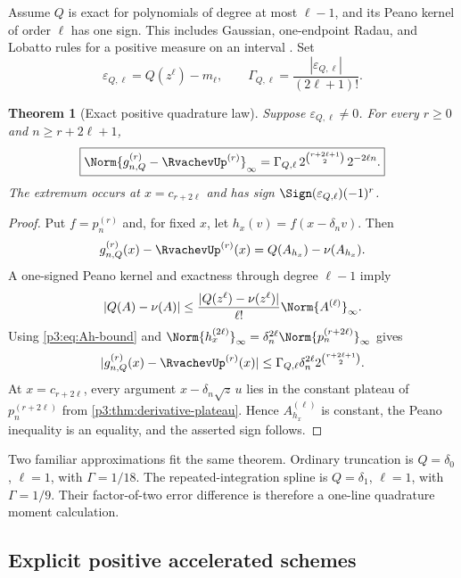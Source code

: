 \documentclass[11pt,oneside]{article}
\numberwithin{equation}{section}
\newtheorem{theorem}{Theorem}[section]
\theoremstyle{definition}
\theoremstyle{remark}
\begin{document}
Assume $Q$ is exact for polynomials of degree at most $\ell-1$, and its Peano kernel
of order $\ell$ has one sign.  This includes Gaussian, one-endpoint Radau, and
Lobatto rules for a positive measure on an interval \cite{p3:davis-rabinowitz,p3:gautschi}.
Set
\begin{equation}
 \varepsilon_{Q,\ell}=Q(z^\ell)-m_\ell,
 \qquad
 \Gamma_{Q,\ell}=\frac{|\varepsilon_{Q,\ell}|}{(2\ell+1)!}.
 \label{p3:eq:gammaQ}
\end{equation}

\begin{theorem}[Exact positive quadrature law]
\label{p3:thm:quadrature-law}
Suppose $\varepsilon_{Q,\ell}\ne0$.  For every $r\ge0$ and
$n\ge r+2\ell+1$,
\begin{equation}
 \boxed{
 \Norm{g_{n,Q}^{(r)}-\RvachevUp^{(r)}}_\infty
 =\Gamma_{Q,\ell}\,
 2^{\binom{r+2\ell+1}{2}}\,2^{-2\ell n}.}
 \label{p3:eq:quadrature-law}
\end{equation}
The extremum occurs at $x=c_{r+2\ell}$ and has sign
$\Sign(\varepsilon_{Q,\ell})(-1)^r$.
\end{theorem}

\begin{proof}
Put $f=p_n^{(r)}$ and, for fixed $x$, let
$h_x(v)=f(x-\delta_nv)$.  Then
\[
 g_{n,Q}^{(r)}(x)-\RvachevUp^{(r)}(x)
 =Q(A_{h_x})-\nu(A_{h_x}).
\]
A one-signed Peano kernel and exactness through degree $\ell-1$ imply
\[
 |Q(A)-\nu(A)|
 \le\frac{|Q(z^\ell)-\nu(z^\ell)|}{\ell!}\Norm{A^{(\ell)}}_\infty.
\]
Using \cref{p3:eq:Ah-bound} and
$\Norm{h_x^{(2\ell)}}_\infty
 =\delta_n^{2\ell}\Norm{p_n^{(r+2\ell)}}_\infty$ gives
\[
 |g_{n,Q}^{(r)}(x)-\RvachevUp^{(r)}(x)|
 \le\Gamma_{Q,\ell}\delta_n^{2\ell}
 2^{\binom{r+2\ell+1}{2}}.
\]
At $x=c_{r+2\ell}$, every argument
$x-\delta_n\sqrt z\,u$ lies in the constant plateau of
$p_n^{(r+2\ell)}$ from \cref{p3:thm:derivative-plateau}.  Hence
$A_{h_x}^{(\ell)}$ is constant, the Peano inequality is an equality, and the asserted
sign follows.
\end{proof}

Two familiar approximations fit the same theorem.  Ordinary truncation is
$Q=\delta_0$, $\ell=1$, with $\Gamma=1/18$.  The repeated-integration spline is
$Q=\delta_1$, $\ell=1$, with $\Gamma=1/9$.  Their factor-of-two error difference is
therefore a one-line quadrature moment calculation.

\subsection{Explicit positive accelerated schemes}
\end{document}
